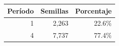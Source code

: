 \begin{tabular}{rrr}
\toprule
Período & Semillas & Porcentaje \\
\midrule
1 & 2,263 & 22.6\% \\
4 & 7,737 & 77.4\% \\
\bottomrule
\end{tabular}
